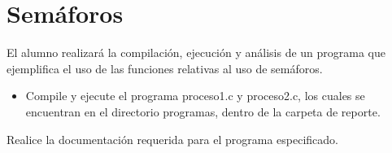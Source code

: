 \section{Semáforos}

	El alumno realizará la compilación, ejecución y análisis de un programa que ejemplifica el uso de las funciones relativas al uso de semáforos.

\begin{itemize}

	\item Compile y ejecute el programa proceso1.c y proceso2.c, los cuales se encuentran en el directorio programas, dentro de la carpeta de reporte.
	
\end{itemize}

	Realice la documentación requerida para el programa especificado.
	